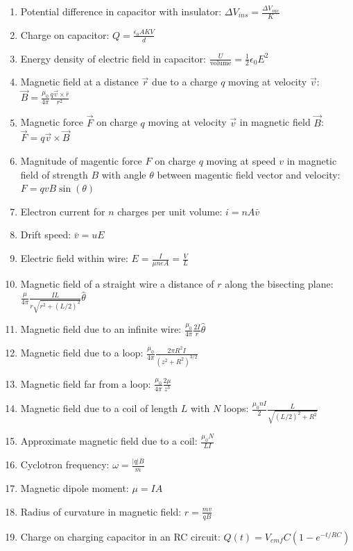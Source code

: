 \documentclass[nobib]{tufte-handout}
\begin{document}
\begin{enumerate}
    \item Potential difference in capacitor with insulator: $\Delta V_{ins} = \frac{\Delta V_{vac}}{K}$
    \item Charge on capacitor: $Q=\frac{\epsilon_0 AKV}{d}$
    \item Energy density of electric field in capacitor: $\frac{U}{\text{volume}} = \frac{1}{2} \epsilon_0 E^2$
    \item Magnetic field at a distance $\vec{r}$ due to a charge $q$ moving at velocity $\vec{v}$: $\vec{B} = \frac{\mu_0}{4 \pi}\frac{q\vec{v}\times \hat{r}}{r^2}$
    \item Magnetic force $\vec{F}$ on charge $q$ moving at velocity $\vec{v}$ in magnetic field $\vec{B}$: 
    $\vec{F} = q\vec{v} \times \vec{B}$
    \item Magnitude of magentic force $F$ on charge $q$ moving at speed $v$ in magnetic field of strength $B$
    with angle $\theta$ between magentic field vector and velocity: $F = qvB\sin(\theta)$
    \item Electron current for $n$ charges per unit volume: $i = nA\bar{v}$
    \item Drift speed: $\bar{v} = uE$
    \item Electric field within wire: $E = \frac{I}{\mu n e A} = \frac{V}{L}$
    \item Magnetic field of a straight wire a distance of $r$ along the bisecting plane: 
    $\frac{\mu}{4 \pi} \frac{IL}{r\sqrt{r^2+(L/2)^2}}\hat{\theta}$
    \item Magnetic field due to an infinite wire: $\frac{\mu_0}{4 \pi} \frac{2I}{r}\hat{\theta}$
    \item Magnetic field due to a loop: $\frac{\mu_0}{4 \pi} \frac{2 \pi R^2 I}{(z^2+R^2)^{3/2}}$
    \item Magnetic field far from a loop: $\frac{\mu_0}{4 \pi}\frac{2 \mu}{z^3}$
    \item Magnetic field due to a coil of length $L$ with $N$ loops: $\frac{\mu_0 nI}{2} \frac{L}{\sqrt{(L/2)^2 + R^2}}$
    \item Approximate magnetic field due to a coil: $\frac{\mu_0 N}{LI}$
    \item Cyclotron frequency: $\omega = \frac{|q|B}{m}$
    \item Magnetic dipole moment: $\mu = IA$
    \item Radius of curvature in magnetic field: $r = \frac{mv}{qB}$
    \item Charge on charging capacitor in an RC circuit: $Q(t) = V_{emf} C (1-e^{-t/RC})$

\end{enumerate}
\end{document}
